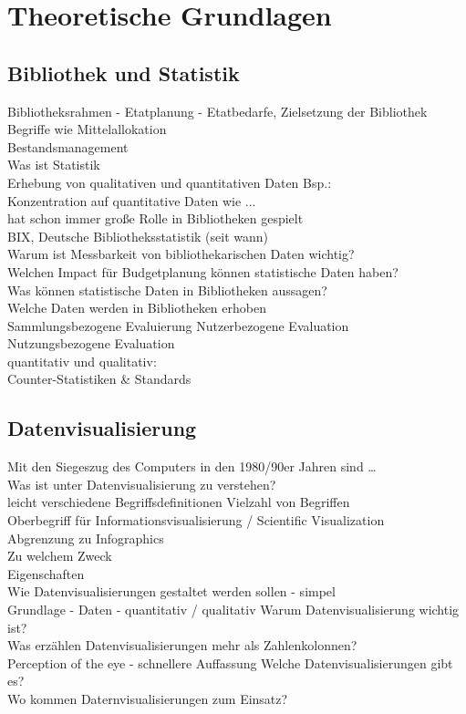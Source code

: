 \chapter{Theoretische Grundlagen}
\label{chap:two}
\section{Bibliothek und Statistik}
\label{chap:two_one}
Bibliotheksrahmen - Etatplanung - Etatbedarfe, Zielsetzung der Bibliothek\\
Begriffe wie Mittelallokation\\
Bestandsmanagement\\
Was ist Statistik\\
Erhebung von qualitativen und quantitativen Daten Bsp.:\\
Konzentration auf quantitative Daten wie ...\\
hat schon immer große Rolle in Bibliotheken gespielt\\
BIX, Deutsche Bibliotheksstatistik (seit wann)\\
Warum ist Messbarkeit von bibliothekarischen Daten wichtig?\\
Welchen Impact für Budgetplanung können statistische Daten haben?\\
Was können statistische Daten in Bibliotheken aussagen?\\
Welche Daten werden in Bibliotheken erhoben\\
Sammlungsbezogene Evaluierung
Nutzerbezogene Evaluation\\
Nutzungsbezogene Evaluation\\
quantitativ und qualitativ:\\
Counter-Statistiken \& Standards\\

\clearpage

\section{Datenvisualisierung}
Mit den Siegeszug des Computers in den 1980/90er Jahren sind \dots\\
Was ist unter Datenvisualisierung zu verstehen?\\
leicht verschiedene Begriffsdefinitionen
Vielzahl von Begriffen\\ 
Oberbegriff für Informationsvisualisierung / Scientific Visualization\\
Abgrenzung zu Infographics\\
Zu welchem Zweck\\
Eigenschaften\\
Wie Datenvisualisierungen gestaltet werden sollen - simpel\\
Grundlage - Daten - quantitativ / qualitativ
Warum Datenvisualisierung wichtig ist?\\
Was erzählen Datenvisualisierungen mehr als Zahlenkolonnen?\\
Perception of the eye - schnellere Auffassung
Welche Datenvisualisierungen gibt es?\\
Wo kommen Daternvisualisierungen zum Einsatz?\\



